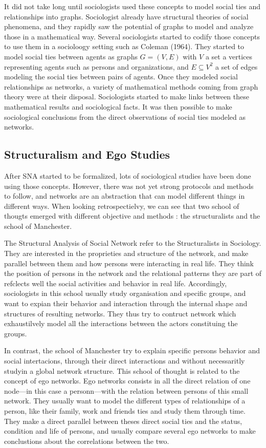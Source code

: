 It did not take long until sociologists used these concepts to model social ties and relationships into graphs. Sociologist already have structural theories of social phenomena, and they rapidly saw the potential of graphs to model and analyze those in a mathematical way. Several sociologists started to codify those concepts to use them in a socioloogy setting such as Coleman (1964).
They started to model social ties between agents as graphs $G = (V, E)$ with $V$ a set a vertices representing agents such as persons and organizations, and $E \subseteq V^2$ a set of edges modeling the social ties between pairs of agents.
Once they modeled social relationships as networks, a variety of mathematical methods coming from graph theory were at their disposal.
Sociologists started to make links between these mathematical results and sociological facts. It was then possible to make sociological conclusions from the direct observations of social ties modeled as networks.



\subsection{Structuralism and Ego Studies}

After SNA started to be formalized, lots of sociological studies have been done using those concepts. However, there was not yet strong protocols and methods to follow, and networks are an abstraction that can model different things in different ways. When looking retrospectielvy, we can see that two school of thougts emerged with different objective and methods : the structuralists and the school of Manchester.

The Structural Analysis of Social Network refer to the Structuralists in Sociology. They are interested in the proprieties and structure of the network, and make parallel between them and how persons were interacting in real life. They think the position of persons in the network and the relational patterns they are part of refclects well the  social activities and behavior in real life. Accordingly, sociologists in this school usually study organisation and specific groups, and want to expian their behavior and interaction through the internal shape and structures of resulting networks. They thus try to contruct network which exhaustilvely model all the interactions between the actors constituing the groups.

In contrast, the school of Manchester try to explain specific persons behavior and social intertacions, through their direct interactions and without necessaritly studyin a global network structure. This school of thought is related to the concept of ego networks. Ego networks consists in all the direct relation of one node---in this case a personn---with the relation between persons of this small network. They usually want to model the different types of relationships of a person, like their family, work and friends ties and study them through time. They make a direct parallel between theses direct social ties and the status, condition and life of persons, and usually compare several ego networks to make conclustions about the correlations between the two.

